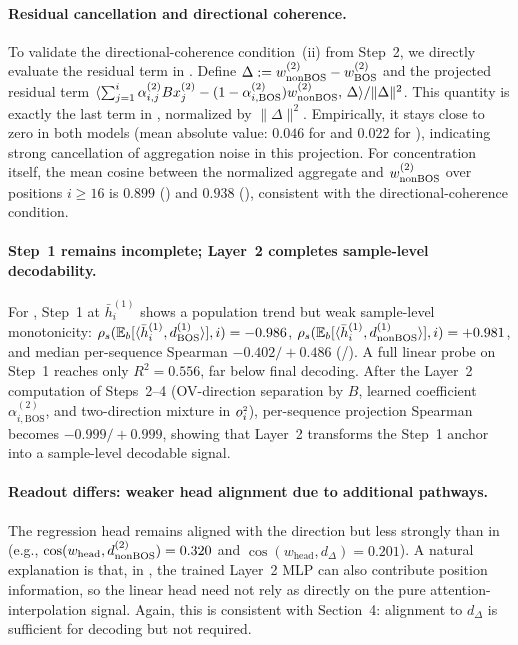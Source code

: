 \documentclass{article}
\theoremstyle{plain}
\theoremstyle{definition}
\theoremstyle{remark}
\begin{document}
\paragraph{Residual cancellation and directional coherence.}
To validate the directional-coherence condition~(ii) from Step~2, we directly evaluate the residual term in
.
Define
\(
\Delta := w_{\text{nonBOS}}^{(2)}-w_{\text{BOS}}^{(2)}
\)
and the projected residual term
\(
\langle \sum_{j=1}^{i}\alpha^{(2)}_{i,j} Bx_j^{(2)}
- (1-\alpha^{(2)}_{i,\mathrm{BOS}})w_{\text{nonBOS}}^{(2)},\,\Delta\rangle/\|\Delta\|^2
\).
This quantity is exactly the last term in , normalized by $\|\Delta\|^2$.
Empirically, it stays close to zero in both models (mean absolute value: $0.046$ for \modelminimal and $0.022$ for \modelfull), indicating strong cancellation of \nbos aggregation noise in this projection.
For concentration itself, the mean cosine between the normalized \nbos aggregate and $w_{\text{nonBOS}}^{(2)}$ over positions $i\ge16$ is $0.899$ (\modelminimal) and $0.938$ (\modelfull), consistent with the directional-coherence condition.



\paragraph{Step~1 remains incomplete; Layer~2 completes sample-level decodability.}
For \modelfull, Step~1 at $\bar h_i^{(1)}$ shows a population trend but weak sample-level monotonicity:
\(\rho_s(\mathbb{E}_b[\langle \bar h_i^{(1)}, d_{\text{BOS}}^{(1)}\rangle], i)=-0.986\),
\(\rho_s(\mathbb{E}_b[\langle \bar h_i^{(1)}, d_{\text{nonBOS}}^{(1)}\rangle], i)=+0.981\), and median per-sequence Spearman
$-0.402/+0.486$ (\bos/\nbos).
A full linear probe on Step~1 reaches only $R^2=0.556$, far below final decoding.
After the Layer~2 computation of Steps~2--4 (OV-direction separation by $B$, learned \bos coefficient $\alpha^{(2)}_{i,\mathrm{BOS}}$,
and two-direction mixture in $o_{i}^{\scriptscriptstyle 2}$), per-sequence projection Spearman becomes
$-0.999/+0.999$,
showing that Layer~2 transforms the Step~1 anchor into a sample-level decodable signal.

\paragraph{Readout differs: weaker head alignment due to additional pathways.}
The regression head remains aligned with the \nbos direction but less strongly than in \modelminimal
(e.g., $\cos(w_{\text{head}},d_{\text{nonBOS}}^{(2)})=0.320$ and
$\cos(w_{\text{head}},d_{\Delta})=0.201$).
A natural explanation is that, in \modelfull, the trained Layer~2 MLP can also contribute position information, so the
linear head need not rely as directly on the pure attention-interpolation signal.
Again, this is consistent with Section~4: alignment to $d_{\Delta}$ is sufficient for decoding but not required.
\end{document}
